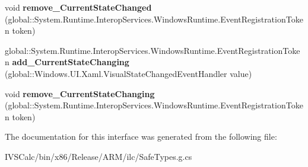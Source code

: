 \begin{DoxyCompactItemize}
\item 
\mbox{\label{interface_windows_1_1_u_i_1_1_xaml_1_1_i_visual_state_group_a851cf8f9cf416f903308f91d9dc794cb}} 
void {\bfseries remove\+\_\+\+Current\+State\+Changed} (global\+::\+System.\+Runtime.\+Interop\+Services.\+Windows\+Runtime.\+Event\+Registration\+Token token)
\item 
\mbox{\label{interface_windows_1_1_u_i_1_1_xaml_1_1_i_visual_state_group_a15af6808561ea3eb12afb9f3dc76cfb7}} 
global\+::\+System.\+Runtime.\+Interop\+Services.\+Windows\+Runtime.\+Event\+Registration\+Token {\bfseries add\+\_\+\+Current\+State\+Changing} (global\+::\+Windows.\+U\+I.\+Xaml.\+Visual\+State\+Changed\+Event\+Handler value)
\item 
\mbox{\label{interface_windows_1_1_u_i_1_1_xaml_1_1_i_visual_state_group_ac006c519047c6976b91b945fef41af29}} 
void {\bfseries remove\+\_\+\+Current\+State\+Changing} (global\+::\+System.\+Runtime.\+Interop\+Services.\+Windows\+Runtime.\+Event\+Registration\+Token token)
\end{DoxyCompactItemize}


The documentation for this interface was generated from the following file\+:\begin{DoxyCompactItemize}
\item 
I\+V\+S\+Calc/bin/x86/\+Release/\+A\+R\+M/ilc/Safe\+Types.\+g.\+cs\end{DoxyCompactItemize}
